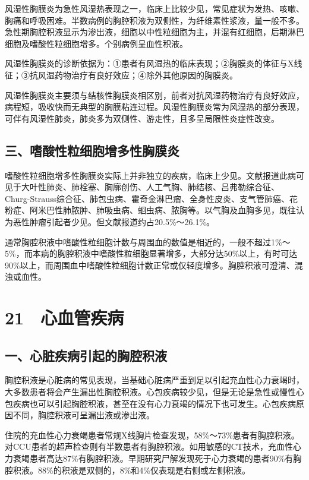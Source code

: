 风湿性胸膜炎为急性风湿热表现之一，临床上比较少见，常见症状为发热、咳嗽、胸痛和呼吸困难。半数病例的胸腔积液为双侧性，为纤维素性浆液，量一般不多。急性期胸腔积液显示为渗出液，细胞以中性粒细胞为主，并混有红细胞，后期淋巴细胞及嗜酸性粒细胞增多。个别病例呈血性积液。

风湿性胸膜炎的诊断依据为：①患者有风湿热的临床表现；②胸膜炎的体征与X线征；③抗风湿药物治疗有良好效应；④除外其他原因的胸膜炎。

风湿性胸膜炎主要须与结核性胸膜炎相区别，前者对抗风湿药物治疗有良好效应，病程短，吸收快而无典型的胸膜粘连过程。风湿性胸膜炎常为风湿热的部分表现，可伴有风湿性肺炎，肺炎多为双侧性、游走性，且多呈局限性炎症性改变。

\subsection{三、嗜酸性粒细胞增多性胸膜炎}

嗜酸性粒细胞增多性胸膜炎实际上并非独立的疾病，临床上少见。文献报道此病可见于大叶性肺炎、肺栓塞、胸廓创伤、人工气胸、肺结核、吕弗勒综合征、Churg-Strauss综合征、肺包虫病、霍奇金淋巴瘤、全身性皮炎、支气管肺癌、花粉症、阿米巴性肺脓肿、肺吸虫病、蛔虫病、脓胸等。以气胸及血胸多见，既往认为恶性肿瘤引起者少见。但文献报道约占20.5\%～26.1\%。

通常胸腔积液中嗜酸性粒细胞计数与周围血的数值是相近的，一般不超过1\%～5\%，而本病的胸腔积液中嗜酸性粒细胞显著增多，大部分达50\%以上，有时可达90\%以上，而周围血中嗜酸性粒细胞计数正常或仅轻度增多。胸腔积液可澄清、混浊或血性。

\protect\hypertarget{text00073.html}{}{}

\section{21　心血管疾病}

\subsection{一、心脏疾病引起的胸腔积液}

胸腔积液是心脏病的常见表现，当基础心脏病严重到足以引起充血性心力衰竭时，大多数患者将会产生漏出性胸腔积液。心包疾病较少见，但是无论是急性或慢性心包疾病也可以引起胸腔积液，甚至在没有心力衰竭的情况下也可发生。心包疾病原因不同，胸腔积液可呈漏出液或渗出液。

住院的充血性心力衰竭患者常规X线胸片检查发现，58\%～73\%患者有胸腔积液。对CCU患者的超声检查则有半数患者有胸腔积液。如用敏感的CT技术，充血性心力衰竭患者高达87\%有胸腔积液。早期研究尸解发现死于心力衰竭的患者90\%有胸腔积液。88\%的积液是双侧的，8\%和4\%仅表现是右侧或左侧积液。


